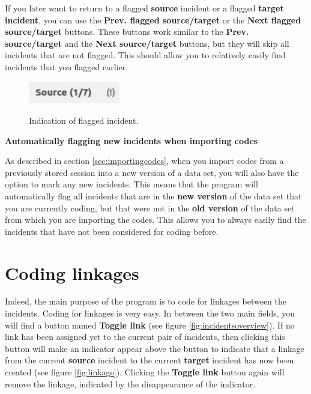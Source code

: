 \documentclass{memoir}
\begin{document}
If you later want to return to a flagged \textbf{source} incident or a flagged \textbf{target incident}, you can use the \textbf{Prev. flagged source/target} or the \textbf{Next flagged source/target} buttons. These buttons work similar to the \textbf{Prev. source/target} and the \textbf{Next source/target} buttons, but they will skip all incidents that are not flagged. This should allow you to relatively easily find incidents that you flagged earlier.

\begin{figure}[h!]
  \centering
  \caption{Indication of flagged incident.}
  \includegraphics[width=40mm]{Screenshot_9.pdf}
  \label{fig:flaggedincident}
\end{figure}


\begin{framed}
\textbf{Automatically flagging new incidents when importing codes}
  
  As described in section \ref{sec:importingcodes}, when you import codes from a previously stored session into a new version of a data set, you will also have the option to mark any new incidents. This means that the program will automatically flag all incidents that are in the \textbf{new version} of the data set that you are currently coding, but that were not in the \textbf{old version} of the data set from which you are importing the codes. This allows you to always easily find the incidents that have not been considered for coding before. 
\end{framed}


\section{Coding linkages}
\label{sec:codinglinkages}

Indeed, the main purpose of the program is to code for linkages between the incidents. Coding for linkages is very easy. In between the two main fields, you will find a button named \textbf{Toggle link} (see figure \ref{fig:incidentsoverview}). If no link has been assigned yet to the current pair of incidents, then clicking this button will make an indicator appear above the button to indicate that a linkage from the current \textbf{source} incident to the current \textbf{target} incident has now been created (see figure \ref{fig:linkage}). Clicking the \textbf{Toggle link} button again will remove the linkage, indicated by the disappearance of the indicator.
\end{document}
